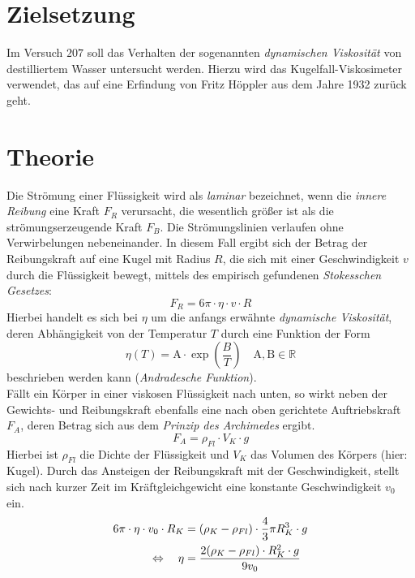 \section*{Zielsetzung}
Im Versuch $207$ soll das Verhalten der sogenannten \emph{dynamischen Viskosität} von destilliertem Wasser untersucht werden. Hierzu wird das Kugelfall-Viskosimeter verwendet,
das auf eine Erfindung von Fritz Höppler aus dem Jahre 1932 zurück geht. \cite{wiki}

\section{Theorie}
Die Strömung einer Flüssigkeit wird als \emph{laminar} bezeichnet, wenn die \emph{innere Reibung} eine Kraft $F_R$ verursacht, die wesentlich größer ist
als die strömungserzeugende Kraft $F_B$. Die Strömungslinien verlaufen ohne Verwirbelungen nebeneinander.
In diesem Fall ergibt sich der Betrag der Reibungskraft auf eine Kugel mit Radius $R$, die sich mit einer Geschwindigkeit
$v$ durch die Flüssigkeit bewegt, mittels des empirisch gefundenen \emph{Stokesschen Gesetzes}:
\begin{equation}
  F_R = 6 \pi \cdot \eta \cdot v \cdot R
  \label{eq: stokes}
\end{equation}
Hierbei handelt es sich bei $\eta$ um die anfangs erwähnte \emph{dynamische Viskosität}, deren Abhängigkeit von der Temperatur $T$ durch eine Funktion der Form
\begin{equation}
  \eta(T) = \mathup{A} \cdot \exp\left(\frac{B}{T}\right) \quad \mathup{A}, \mathup{B} \in \mathbb{R}
  \label{eq: andrad}
\end{equation}
beschrieben werden kann (\emph{Andradesche Funktion}). \\
Fällt ein Körper in einer viskosen Flüssigkeit nach unten, so wirkt neben der Gewichts- und Reibungskraft ebenfalls eine nach oben gerichtete Auftriebskraft $F_A$, deren
Betrag sich aus dem \emph{Prinzip des Archimedes} ergibt.
\begin{equation}
  F_A = \rho_{Fl} \cdot V_K \cdot g
\end{equation}
Hierbei ist $\rho_{Fl}$ die Dichte der Flüssigkeit und $V_K$ das Volumen des Körpers (hier: Kugel). Durch das Ansteigen der Reibungskraft mit der Geschwindigkeit,
stellt sich nach kurzer Zeit im Kräftgleichgewicht eine konstante Geschwindigkeit $v_0$ ein.
\begin{align}
  \begin{aligned}
  6 \pi \cdot \eta \cdot v_0 \cdot R_K  &= (\rho_K - \rho_{Fl}) \cdot \frac{4}{3}\pi R_K^3 \cdot g  \\
  \hfill
  \Leftrightarrow \quad \eta &= \frac{2 (\rho_K - \rho_{Fl}) \cdot R_K^2 \cdot  g}{9 v_0}
\end{aligned}
\end{align}
